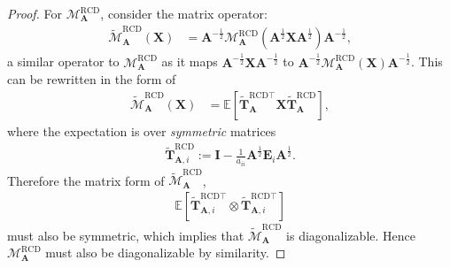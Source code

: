 \documentclass{article}
\theoremstyle{plain}
\theoremstyle{definition}
\theoremstyle{remark}
\def\bigclosed#1{\left[#1\right]}
\newcommand{\RCD}{\text{RCD}} %
\newcommand{\MARCD}{\mathcal{M}_{\bm{A}}^{\RCD}} %
\def\mA{{\bm{A}}}
\def\mE{{\bm{E}}}
\def\mI{{\bm{I}}}
\def\mT{{\bm{T}}}
\def\mX{{\bm{X}}}
\def\gM{{\mathcal{M}}}
\newcommand{\E}{\mathbb{E}}
\begin{document}
\begin{proof}
    For $\MARCD$, consider the matrix operator:
    \begin{align*}
        \widetilde{\gM}_{\mA}^{\RCD} (\mX) &= \mA^{-\frac12} \MARCD (\mA^{\frac12} \mX \mA^{\frac12}) \mA^{-\frac12},
    \end{align*}
    a similar operator to $\MARCD$ as it maps $\mA^{-\frac12} \mX \mA^{-\frac12}$ to $\mA^{-\frac12} \MARCD (\mX) \mA^{-\frac12}$.
    This can be rewritten in the form of
    \begin{align*}
        \widetilde{\gM}_{\mA}^{\RCD} (\mX) &= \E \bigclosed{\widetilde{\mT}_{\mA}^{\RCD \top} \mX \widetilde{\mT}_{\mA}^{\RCD}},
    \end{align*}
    where the expectation is over \emph{symmetric} matrices
    \begin{align*}
        \widetilde{\mT}_{\mA, i}^{\RCD} := \mI - \frac{1}{a_{ii}} \mA^{\frac12} \mE_{i} \mA^{\frac12}.
    \end{align*}
    Therefore the matrix form of $\widetilde{\gM}_{\mA}^{\RCD}$,
    \begin{align*}        
        \E \bigclosed{\widetilde{\mT}_{\mA, i}^{\RCD \top} \otimes \widetilde{\mT}_{\mA, i}^{\RCD \top}}
    \end{align*}
    must also be symmetric, which implies that $\widetilde{\gM}_{\mA}^{\RCD}$ is diagonalizable.
    Hence $\MARCD$ must also be diagonalizable by similarity.


\end{proof}
\end{document}
